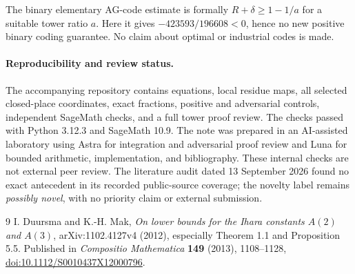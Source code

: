 \documentclass[11pt]{article}
\begin{document}
The binary elementary AG-code estimate is formally $R+\delta\ge1-1/a$ for
a suitable tower ratio $a$. Here it gives $-423593/196608<0$, hence no new
positive binary coding guarantee. No claim about optimal or industrial codes
is made.

\paragraph{Reproducibility and review status.}
The accompanying repository contains equations, local residue maps, all
selected closed-place coordinates, exact fractions, positive and adversarial
controls, independent SageMath checks, and a full tower proof review.
The checks passed with Python 3.12.3 and SageMath 10.9. The note was prepared
in an AI-assisted laboratory using Astra for integration and adversarial proof
review and Luna for bounded arithmetic, implementation, and bibliography.
These internal checks are not external peer review. The literature audit dated
13 September 2026 found no exact antecedent in its recorded public-source
coverage; the novelty label remains \emph{possibly novel}, with no priority
claim or external submission.

\begin{thebibliography}{9}
 I. Duursma and K.-H. Mak,
\emph{On lower bounds for the Ihara constants $A(2)$ and $A(3)$},
arXiv:1102.4127v4 (2012), especially Theorem 1.1 and Proposition 5.5.
Published in \emph{Compositio Mathematica} \textbf{149} (2013), 1108--1128,
\href{https://doi.org/10.1112/S0010437X12000796}{doi:10.1112/S0010437X12000796}.
\end{thebibliography}
\end{document}
